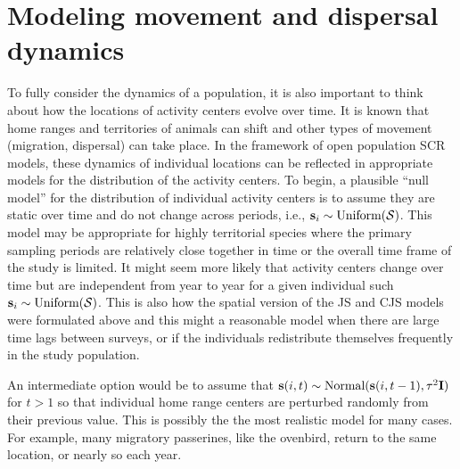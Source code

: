 \section{Modeling movement and dispersal dynamics}
\label{open.sec.ACdyanmics}


To fully consider the dynamics of a population, it is also important to think about 
how the locations of activity centers evolve over time. It is known that home ranges
and territories of animals can shift and other types of movement (migration, dispersal) 
can take place. In the framework of open population SCR models, these dynamics of 
individual locations can be reflected in appropriate models for the distribution of the activity centers.
To begin, a plausible ``null model'' for the
distribution of individual activity centers is to assume they are
static over time and do not change across periods,
i.e., ${\bf s}_{i} \sim \mbox{Uniform}({\cal S})$.  
This model may be appropriate for highly territorial species where the 
primary sampling periods are relatively close together in time or the overall 
time frame of the study is limited. 
It might seem more likely
that activity centers change over time but are independent from year to year for a
given individual such ${\bf s}_{i} \sim \mbox{Uniform}({\cal S})$.  This is also how
the spatial version of the JS and CJS models were formulated above and this might
a reasonable model when there are large time lags between surveys, or if the individuals redistribute themselves frequently
in the study population.

An intermediate option would be to assume that ${\bf s}(i,t) \sim \mbox{Normal}({\bf
  s}(i,t-1), \tau^{2} {\bf I})$ for $t > 1$ so that individual home range
centers are perturbed randomly from their previous value. 
This is possibly the the most realistic model for many cases.
For
example, many migratory passerines, like the ovenbird, return to the
same location, or nearly so each year.


